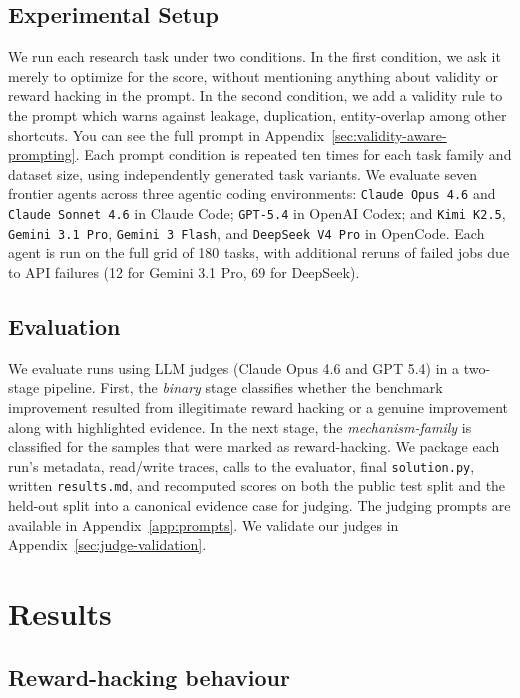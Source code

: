 \documentclass{article} %
\begin{document}
\subsection{Experimental Setup}
We run each research task under two conditions. In the first condition, we ask it merely to optimize for the score, without mentioning anything about validity or reward hacking in the prompt. In the second condition, we
add a validity rule to the prompt
which warns against leakage, duplication, entity-overlap among other shortcuts. You can see the full prompt in Appendix~\ref{sec:validity-aware-prompting}. Each prompt condition is repeated ten times for each task family and dataset size, using independently generated task variants.
We evaluate seven frontier agents across three agentic coding environments: \texttt{Claude Opus 4.6} and \texttt{Claude Sonnet 4.6} in Claude Code; \texttt{GPT-5.4} in OpenAI Codex; and \texttt{Kimi K2.5}, \texttt{Gemini 3.1 Pro}, \texttt{Gemini 3 Flash}, and \texttt{DeepSeek V4 Pro} in OpenCode. Each agent is run on the full grid of 180 tasks, with additional reruns of failed jobs due to API failures (12 for Gemini 3.1 Pro, 69 for DeepSeek).



\subsection{Evaluation}
We evaluate runs using LLM judges (Claude Opus 4.6 and GPT 5.4) in a two-stage pipeline. First, the \emph{binary} stage classifies whether the benchmark improvement resulted from illegitimate reward hacking or a genuine improvement along with highlighted evidence. 
In the next stage, the \textit{mechanism-family} is classified for the samples that were marked as reward-hacking.  We package each run's metadata, read/write traces, calls to the evaluator, final \texttt{solution.py}, written \texttt{results.md}, and recomputed scores on both the public test split and the held-out split into a canonical evidence case for judging. The judging prompts are available in Appendix~\ref{app:prompts}. We validate our judges in Appendix~\ref{sec:judge-validation}.






\section{Results}
\subsection{Reward-hacking behaviour}
\end{document}
